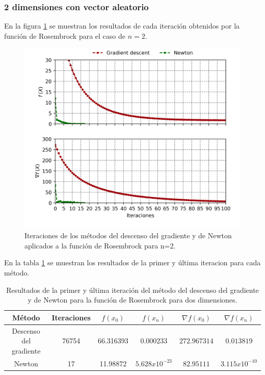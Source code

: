 \subsubsection{2 dimensiones con vector aleatorio}

En la figura \ref{fig:rosembrock_2_random} se muestran los resultados de cada iteración obtenidos por la función de Rosembrock para el caso de $n=2$.

\begin{figure}[H]
    \centering
    \includegraphics[width=12cm]{Graphics/Problema_2/rosembrock_2_random.png}
    \caption{Iteraciones de los métodos del descenso del gradiente y de Newton aplicados a la función de Rosembrock para n=2.}
    \label{fig:rosembrock_2_random}
\end{figure}

En la tabla \ref{table:rosembrock_2_random} se muestran los resultados de la primer y última iteracion para cada método.

\begin{table}[H]
    \centering
    \begin{tabular}{cccccc} \hline
        Método                 & Iteraciones & $f(x_0)$  & $f(x_n)$         & $\nabla f(x_0)$ & $\nabla f(x_n) $ \\ \hline
        Descenso del gradiente & 76754       & 66.316393 & $0.000233$       & $272.967314$    & $0.013819$       \\
        Newton                 & 17          & 11.98872  & $5.628x10^{-23}$ & $82.95111$      & $3.115x10^{-10}$ \\ \hline
    \end{tabular}
    \caption{Resultados de la primer y última iteración del método del descenso del gradiente y de Newton para la función de Rosembrock para dos dimensiones.}
    \label{table:rosembrock_2_random}
\end{table}

